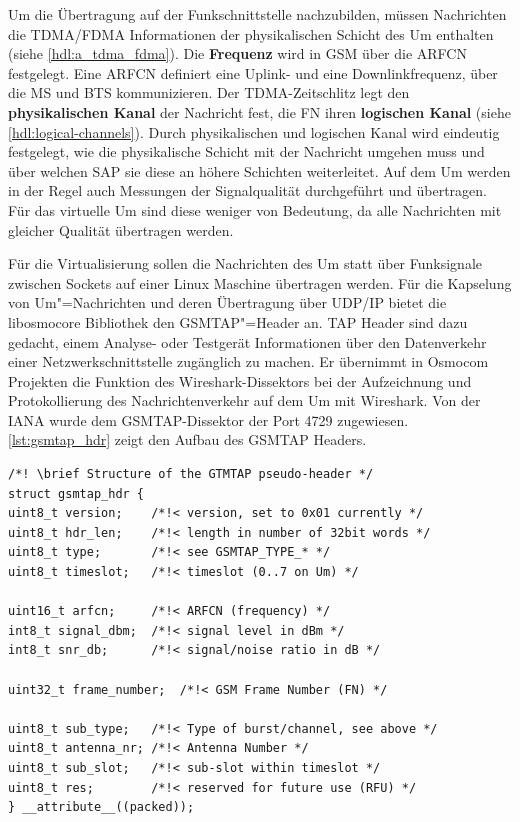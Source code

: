 Um die Übertragung auf der Funkschnittstelle nachzubilden, müssen Nachrichten die \ac{TDMA}/\ac{FDMA} Informationen der physikalischen Schicht des \ac{Um} enthalten (siehe \autoref{hdl:a_tdma_fdma}). Die \textbf{Frequenz} wird in \ac{GSM} über die \ac{ARFCN} festgelegt. Eine \ac{ARFCN} definiert eine Uplink- und eine Downlinkfrequenz, über die \ac{MS} und \ac{BTS} kommunizieren. Der \ac{TDMA}-Zeitschlitz legt den \textbf{physikalischen Kanal} der Nachricht fest, die \ac{FN} ihren \textbf{logischen Kanal} (siehe \autoref{hdl:logical-channels}). Durch physikalischen und logischen Kanal wird eindeutig festgelegt, wie die physikalische Schicht mit der Nachricht umgehen muss und über welchen \ac{SAP} sie diese an höhere Schichten weiterleitet. Auf dem \ac{Um} werden in der Regel auch Messungen der Signalqualität durchgeführt und übertragen. Für das virtuelle \ac{Um} sind diese weniger von Bedeutung, da alle Nachrichten mit gleicher Qualität übertragen werden.

Für die Virtualisierung sollen die Nachrichten des \ac{Um} statt über Funksignale zwischen Sockets auf einer Linux Maschine übertragen werden. Für die Kapselung von \ac{Um}"=Nach\-rich\-ten und deren Übertragung über \ac{UDP}/\ac{IP} bietet die libosmocore Bibliothek den \ac{GSMTAP}"=Header an. \ac{TAP} Header sind dazu gedacht, einem Analyse- oder Testgerät Informationen über den Datenverkehr einer Netzwerkschnittstelle zugänglich zu machen. Er übernimmt in Osmocom Projekten die Funktion des Wireshark-Dissektors bei der Aufzeichnung und Protokollierung des Nachrichtenverkehr auf dem \ac{Um} mit Wireshark. Von der \ac{IANA} wurde dem \ac{GSMTAP}-Dissektor der Port 4729 zugewiesen. \autoref{lst:gsmtap_hdr} zeigt den Aufbau des \ac{GSMTAP} Headers. \\

\begin{lstlisting}[caption={[Der Aufbau des GSMTAP-Headers]Der Aufbau des \ac{GSMTAP}-Headers, aus der libosmocore Bibliothek}, label={lst:gsmtap_hdr}, boxpos=c, frame=single, style=CStyle, numbers=none]
/*! \brief Structure of the GTMTAP pseudo-header */
struct gsmtap_hdr {
uint8_t version;	/*!< version, set to 0x01 currently */
uint8_t hdr_len;	/*!< length in number of 32bit words */
uint8_t type;		/*!< see GSMTAP_TYPE_* */
uint8_t timeslot;	/*!< timeslot (0..7 on Um) */

uint16_t arfcn;		/*!< ARFCN (frequency) */
int8_t signal_dbm;	/*!< signal level in dBm */
int8_t snr_db;		/*!< signal/noise ratio in dB */

uint32_t frame_number;	/*!< GSM Frame Number (FN) */

uint8_t sub_type;	/*!< Type of burst/channel, see above */
uint8_t antenna_nr;	/*!< Antenna Number */
uint8_t sub_slot;	/*!< sub-slot within timeslot */
uint8_t res;		/*!< reserved for future use (RFU) */
} __attribute__((packed));
\end{lstlisting}

